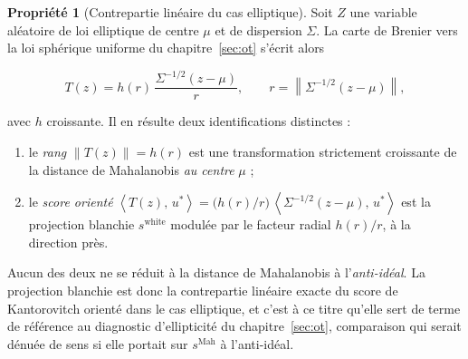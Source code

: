 \documentclass[11pt,a4paper]{article}
\theoremstyle{definition}
\newtheorem{propriete}{Propriété}[section]
\theoremstyle{remark}
\newcommand{\norm}[1]{\left\lVert #1 \right\rVert}
\newcommand{\scal}[2]{\left\langle #1 ,\, #2 \right\rangle}
\begin{document}
\begin{propriete}[Contrepartie linéaire du cas elliptique]
  \label{prop:white-elliptique}
  Soit $Z$ une variable aléatoire de loi elliptique de centre $\mu$ et de dispersion
  $\Sigma$. La carte de Brenier vers la loi sphérique uniforme du
  chapitre~\ref{sec:ot} s'écrit alors

  \medskip

  \[
    T(z) = h(r)\,\frac{\Sigma^{-1/2}(z - \mu)}{r},
    \qquad r = \norm{\Sigma^{-1/2}(z - \mu)},
  \]

  \bigskip

  avec $h$ croissante. Il en résulte deux identifications distinctes :

  \medskip

  \begin{enumerate}[nosep,leftmargin=1.8em]
    \item le \emph{rang} $\norm{T(z)} = h(r)$ est une transformation strictement
    croissante de la distance de Mahalanobis \emph{au centre} $\mu$ ;
    \item le \emph{score orienté} $\scal{T(z)}{u^{*}} = \big(h(r)/r\big)\,
    \scal{\Sigma^{-1/2}(z-\mu)}{u^{*}}$ est la projection blanchie $s^{\mathrm{white}}$
    modulée par le facteur radial $h(r)/r$, à la direction près.
  \end{enumerate}

  \medskip

  Aucun des deux ne se réduit à la distance de Mahalanobis à l'\emph{anti-idéal}. La
  projection blanchie est donc la contrepartie linéaire exacte du score de Kantorovitch
  orienté dans le cas elliptique, et c'est à ce titre qu'elle sert de terme de référence
  au diagnostic d'ellipticité du chapitre~\ref{sec:ot}, comparaison qui serait dénuée de
  sens si elle portait sur $s^{\mathrm{Mah}}$ à l'anti-idéal.
\end{propriete}

\bigskip
\end{document}

